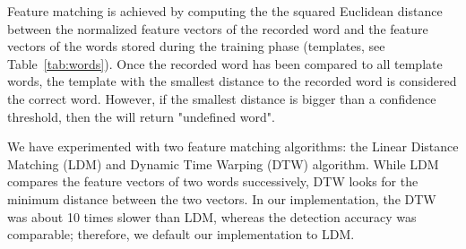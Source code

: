 %
Feature matching is achieved by computing the the squared Euclidean distance between the normalized feature vectors of the recorded word and the feature vectors of the words stored during the training phase (templates, see Table~\ref{tab:words}). 
Once the recorded word has been compared to all template words, the template with the smallest distance to the recorded word is considered the correct word. However, if the smallest distance is bigger than a confidence threshold, then the \cim will return "undefined word". 

We have experimented with two feature matching algorithms: the Linear Distance Matching (LDM) and Dynamic Time Warping (DTW) algorithm. While LDM compares the feature vectors of two words successively, DTW looks for the minimum distance between the two vectors. In our implementation, the DTW was about 10 times slower than LDM, whereas the detection accuracy was comparable; therefore, we default our implementation to LDM.


